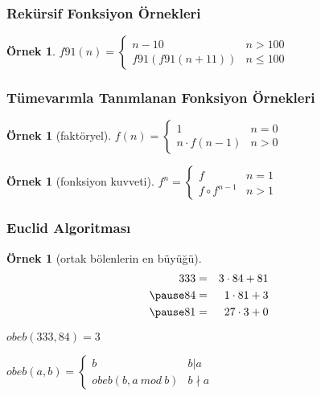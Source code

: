 \documentclass[dvipsnames]{beamer}
\theoremstyle{definition}
\theoremstyle{example}
\newtheorem{ornek}[theorem]{Örnek}
\theoremstyle{plain}
\begin{document}
\begin{frame}
  \frametitle{Rekürsif Fonksiyon Örnekleri}

  \begin{ornek}
    $f91(n) = \left\{
      \begin{array}{ll}
        n - 10         & n > 100\\
        f91(f91(n+11)) & n \leq 100
      \end{array}
    \right.$
  \end{ornek}
\end{frame}

\begin{frame}
  \frametitle{Tümevarımla Tanımlanan Fonksiyon Örnekleri}

  \begin{ornek}[faktöryel]
    $f(n) = \left\{
      \begin{array}{ll}
        1              & n = 0\\
        n \cdot f(n-1) & n > 0
      \end{array}
    \right.$
  \end{ornek}

  \pause
  \begin{ornek}[fonksiyon kuvveti]
    $f^n = \left\{
      \begin{array}{ll}
        f               & n = 1\\
        f \circ f^{n-1} & n > 1
      \end{array}
    \right.$
  \end{ornek}
\end{frame}

\begin{frame}
  \frametitle{Euclid Algoritması}

  \begin{ornek}[ortak bölenlerin en büyüğü]
    \begin{eqnarray*}
      333 & = & 3 \cdot 84 + 81\\\pause
       84 & = & 1 \cdot 81 + 3\\\pause
       81 & = & 27 \cdot 3 + 0
    \end{eqnarray*}

    \pause
    $obeb(333,84) = 3$

    \pause
    \medskip
    $obeb(a,b) = \left\{
      \begin{array}{ll}
        b               & b | a\\
        obeb(b,a~mod~b) & b \nmid a
      \end{array}
    \right.$
  \end{ornek}
\end{frame}
\end{document}
